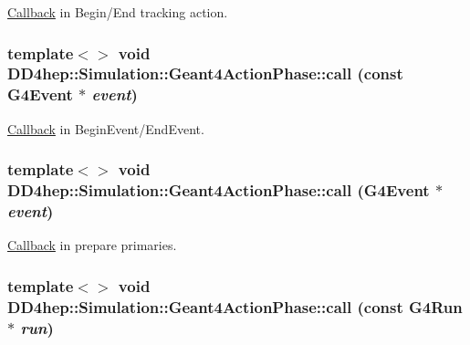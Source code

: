 \hyperlink{class_d_d4hep_1_1_callback}{Callback} in Begin/End tracking action. \hypertarget{class_d_d4hep_1_1_simulation_1_1_geant4_action_phase_ad2d3a9e9414b4808875fa59dd022a310}{
\subsubsection[{call}]{\setlength{\rightskip}{0pt plus 5cm}template$<$$>$ void DD4hep::Simulation::Geant4ActionPhase::call (const G4Event $\ast$ {\em event})}}
\label{class_d_d4hep_1_1_simulation_1_1_geant4_action_phase_ad2d3a9e9414b4808875fa59dd022a310}


\hyperlink{class_d_d4hep_1_1_callback}{Callback} in BeginEvent/EndEvent. \hypertarget{class_d_d4hep_1_1_simulation_1_1_geant4_action_phase_ad645b1ab9a7a1df5b464e3a6fb4df887}{
\subsubsection[{call}]{\setlength{\rightskip}{0pt plus 5cm}template$<$$>$ void DD4hep::Simulation::Geant4ActionPhase::call (G4Event $\ast$ {\em event})}}
\label{class_d_d4hep_1_1_simulation_1_1_geant4_action_phase_ad645b1ab9a7a1df5b464e3a6fb4df887}


\hyperlink{class_d_d4hep_1_1_callback}{Callback} in prepare primaries. \hypertarget{class_d_d4hep_1_1_simulation_1_1_geant4_action_phase_ae866431033c441eca344ef5790755c35}{
\subsubsection[{call}]{\setlength{\rightskip}{0pt plus 5cm}template$<$$>$ void DD4hep::Simulation::Geant4ActionPhase::call (const G4Run $\ast$ {\em run})}}
\label{class_d_d4hep_1_1_simulation_1_1_geant4_action_phase_ae866431033c441eca344ef5790755c35}


